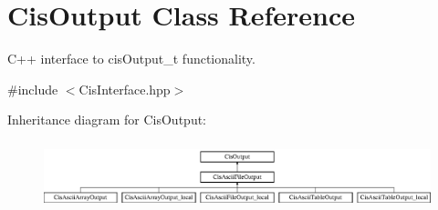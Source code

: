 \hypertarget{classCisOutput}{}\section{Cis\+Output Class Reference}
\label{classCisOutput}


C++ interface to cis\+Output\+\_\+t functionality.  




{\ttfamily \#include $<$Cis\+Interface.\+hpp$>$}

Inheritance diagram for Cis\+Output\+:\begin{figure}[H]
\begin{center}
\leavevmode
\includegraphics[height=1.976471cm]{classCisOutput}
\end{center}
\end{figure}
